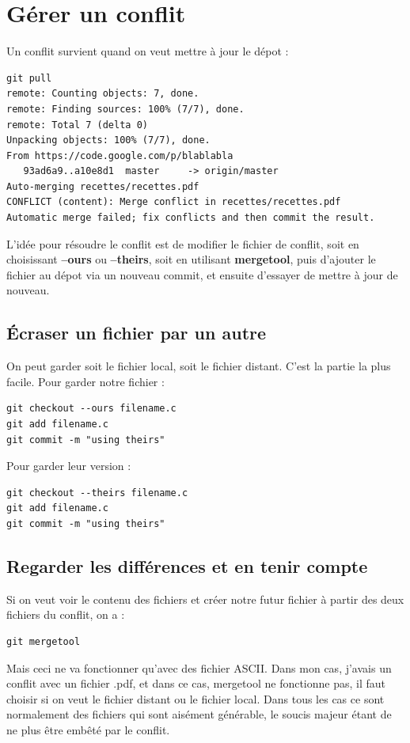\documentclass[a4paper,twoside]{article}
\begin{document}
\section{Gérer un conflit}
Un conflit survient quand on veut mettre à jour le dépot : 
\begin{verbatim}
git pull
remote: Counting objects: 7, done.
remote: Finding sources: 100% (7/7), done.
remote: Total 7 (delta 0)
Unpacking objects: 100% (7/7), done.
From https://code.google.com/p/blablabla
   93ad6a9..a10e8d1  master     -> origin/master
Auto-merging recettes/recettes.pdf
CONFLICT (content): Merge conflict in recettes/recettes.pdf
Automatic merge failed; fix conflicts and then commit the result.
\end{verbatim}

L'idée pour résoudre le conflit est de modifier le fichier de conflit, soit en choisissant \textbf{--ours} ou \textbf{--theirs}, soit en utilisant \textbf{mergetool}, puis d'ajouter le fichier au dépot via un nouveau commit, et ensuite d'essayer de mettre à jour de nouveau.

\subsection{Écraser un fichier par un autre}
On peut garder soit le fichier local, soit le fichier distant. C'est la partie la plus facile. Pour garder notre fichier :
\begin{verbatim}
git checkout --ours filename.c
git add filename.c
git commit -m "using theirs"
\end{verbatim}

Pour garder leur version :
\begin{verbatim}
git checkout --theirs filename.c
git add filename.c
git commit -m "using theirs"
\end{verbatim}

\subsection{Regarder les différences et en tenir compte}
Si on veut voir le contenu des fichiers et créer notre futur fichier à partir des deux fichiers du conflit, on a :
\begin{verbatim}
git mergetool
\end{verbatim}

Mais ceci ne va fonctionner qu'avec des fichier ASCII. Dans mon cas, j'avais un conflit avec un fichier .pdf, et dans ce cas, mergetool ne fonctionne pas, il faut choisir si on veut le fichier distant ou le fichier local. Dans tous les cas ce sont normalement des fichiers qui sont aisément générable, le soucis majeur étant de ne plus être embêté par le conflit.
\end{document}
